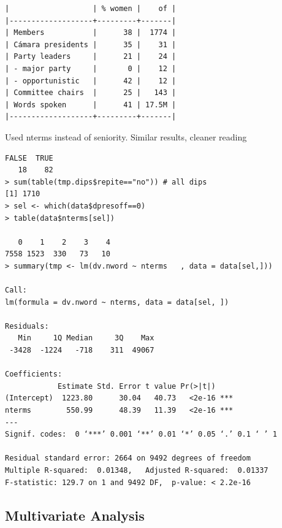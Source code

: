 \documentclass[letter,12pt]{article}
\begin{document}
\singlespacing
  \begin{tiny}
    \begin{verbatim}
|                   | % women |    of |
|-------------------+---------+-------|
| Members           |      38 |  1774 |
| Cámara presidents |      35 |    31 |
| Party leaders     |      21 |    24 |
| - major party     |       0 |    12 |
| - opportunistic   |      42 |    12 |
| Committee chairs  |      25 |   143 |
| Words spoken      |      41 | 17.5M |
|-------------------+---------+-------|
    \end{verbatim}
  \end{tiny}
\doublespacing  

Used nterms instead of seniority. Similar results, cleaner reading

\singlespacing
  \begin{tiny}
    \begin{verbatim}
FALSE  TRUE 
   18    82 
> sum(table(tmp.dips$repite=="no")) # all dips
[1] 1710
> sel <- which(data$dpresoff==0)
> table(data$nterms[sel])

   0    1    2    3    4 
7558 1523  330   73   10 
> summary(tmp <- lm(dv.nword ~ nterms   , data = data[sel,]))

Call:
lm(formula = dv.nword ~ nterms, data = data[sel, ])

Residuals:
   Min     1Q Median     3Q    Max 
 -3428  -1224   -718    311  49067 

Coefficients:
            Estimate Std. Error t value Pr(>|t|)    
(Intercept)  1223.80      30.04   40.73   <2e-16 ***
nterms        550.99      48.39   11.39   <2e-16 ***
---
Signif. codes:  0 ‘***’ 0.001 ‘**’ 0.01 ‘*’ 0.05 ‘.’ 0.1 ‘ ’ 1

Residual standard error: 2664 on 9492 degrees of freedom
Multiple R-squared:  0.01348,	Adjusted R-squared:  0.01337 
F-statistic: 129.7 on 1 and 9492 DF,  p-value: < 2.2e-16
    \end{verbatim}
  \end{tiny}
\doublespacing
  
  \subsection{Multivariate Analysis}
\end{document}
